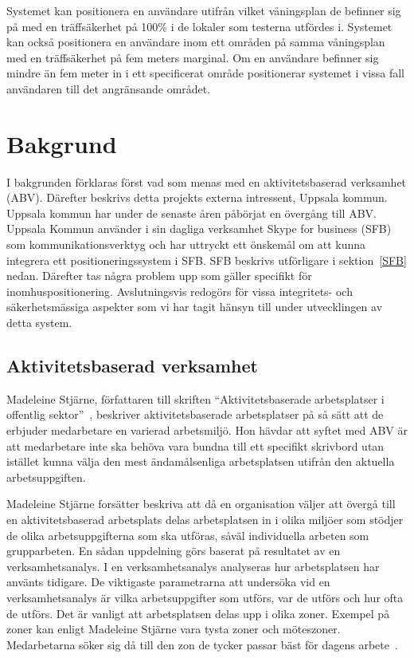 \documentclass[a4paper,12pt]{article}
\begin{document}
 Systemet kan positionera en användare utifrån vilket våningsplan de befinner sig på med en träffsäkerhet på 100\% i de lokaler som testerna utfördes i. Systemet kan också positionera en användare inom ett områden på samma våningsplan med en träffsäkerhet på fem meters marginal. Om en användare befinner sig mindre än fem meter in i ett specificerat område positionerar systemet i vissa fall användaren till det angränsande området.


 \section{Bakgrund}
 I bakgrunden förklaras först vad som menas med en aktivitetsbaserad verksamhet (ABV). Därefter beskrivs detta projekts externa intressent, Uppsala kommun. Uppsala kommun har under de senaste åren påbörjat en övergång till ABV. Uppsala Kommun använder i sin dagliga verksamhet Skype for business (SFB) som kommunikationsverktyg och har uttryckt ett önskemål om att kunna integrera ett positioneringssystem i SFB. SFB beskrivs utförligare i sektion~\ref{SFB} nedan. Därefter tas några problem upp som gäller specifikt för inomhuspositionering. Avslutningsvis redogörs för vissa integritets- och säkerhetsmässiga aspekter som vi har tagit hänsyn till under utvecklingen av detta system.


 \subsection{Aktivitetsbaserad verksamhet}
 Madeleine Stjärne, författaren till skriften ``Aktivitetsbaserade
 arbetsplatser i offentlig sektor''~\cite{ABV}, beskriver aktivitetsbaserade arbetsplatser på så sätt att de erbjuder medarbetare en varierad arbetsmiljö. Hon hävdar att syftet med ABV är att medarbetare inte ska behöva vara bundna till ett specifikt skrivbord utan istället kunna välja den mest ändamålsenliga arbetsplatsen utifrån den aktuella arbetsuppgiften. %

 Madeleine Stjärne forsätter beskriva att då en organisation väljer att övergå till en aktivitetsbaserad arbetsplats delas arbetsplatsen in i olika miljöer som stödjer de olika arbetsuppgifterna som ska utföras, såväl individuella arbeten som grupparbeten. En sådan uppdelning görs baserat på resultatet av en verksamhetsanalys. I en verksamhetsanalys analyseras hur arbetsplatsen har använts tidigare. De viktigaste parametrarna att undersöka vid en verksamhetsanalys är vilka arbetsuppgifter som utförs, var de utförs och hur ofta de utförs. Det är vanligt att arbetsplatsen delas upp i olika zoner. Exempel på zoner kan enligt Madeleine Stjärne vara tysta zoner och möteszoner. Medarbetarna söker sig då till den zon de tycker passar bäst för dagens arbete~\cite{ABV}.
\end{document}
